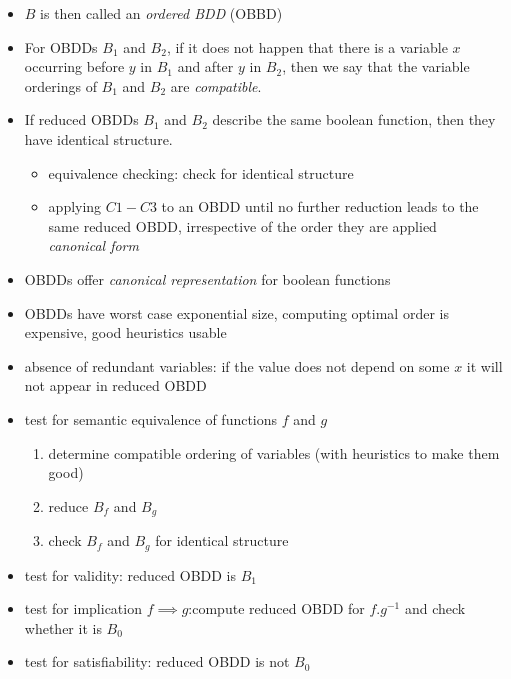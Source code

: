 \documentclass[a4paper, 10pt]{article}
\begin{document}
\begin{mdframed}
\begin{itemize}
    \item $B$ is then called an \emph{ordered BDD} (OBBD)
\end{itemize}
\begin{itemize}
    \item For OBDDs $B_1$ and $B_2$, if it does not happen that there is a variable $x$ occurring before $y$ in $B_1$ and after $y$ in $B_2$, then we say that the variable orderings of $B_1$ and $B_2$ are \emph{compatible}. \\
    \item If reduced OBDDs $B_1$ and $B_2$ describe the same boolean function, then they have identical structure.
    \begin{itemize}
        \item equivalence checking: check for identical structure
        \item applying $C1-C3$ to an OBDD until no further reduction \follows leads to the same reduced OBDD, irrespective of the order they are applied \\
        \follows \emph{canonical form}
    \end{itemize}
    \item OBDDs offer \emph{canonical representation} for boolean functions
    \item OBDDs have worst case exponential size, computing optimal order is expensive, good heuristics usable
\end{itemize}
\begin{itemize}
    \item absence of redundant variables: if the value does not depend on some $x$ it will not appear in reduced OBDD
    \item test for semantic equivalence of functions $f$ and $g$
    \begin{enumerate}
        \item determine compatible ordering of variables (with heuristics to make them good)
        \item reduce $B_f$ and $B_g$
        \item check $B_f$ and $B_g$ for identical structure
    \end{enumerate}
    \item test for validity: reduced OBDD is $B_1$
    \item test for implication $f\implies g$:compute reduced OBDD for $f.g^{-1}$ and check whether it is $B_0$
    \item test for satisfiability: reduced OBDD is not $B_0$

\end{itemize}
\end{mdframed}
\end{document}
